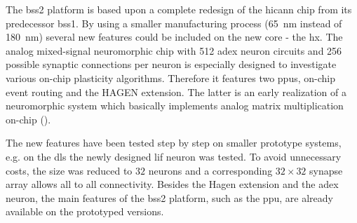 The \gls{bss2} platform is based upon a complete redesign of the \gls{hicann} chip from its predecessor \acrshort{bss1}. By using a smaller manufacturing process (\SI{65}{\nano \m} instead of \SI{180}{\nano \m}) several new features could be included on the new core - the \gls{hx}. The analog mixed-signal neuromorphic chip with 512 \gls{adex} neuron circuits and 256 possible synaptic connections per neuron is especially designed to investigate various on-chip plasticity algorithms. Therefore it features two \glspl{ppu}, on-chip event routing and the HAGEN extension. The latter is an early realization of a neuromorphic system which basically implements analog matrix multiplication on-chip (\citealp{schemmel2020accelerated}).

The new features have been tested step by step on smaller prototype systems, e.g. on the \gls{dls} the newly designed \gls{lif} neuron was tested. To avoid unnecessary costs, the size was reduced to $32$ neurons and a corresponding $32 \times 32$ synapse array allows all to all connectivity. Besides the Hagen extension and the \gls{adex} neuron, the main features of the \gls{bss2} platform, such as the \gls{ppu}, are already available on the prototyped versions.



